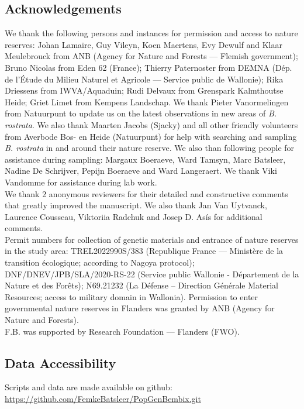 \documentclass[10pt, twoside]{book} %
\begin{document}
\clearpage
	\subsection*{Acknowledgements}
	We thank the following persons and instances for permission and access to nature reserves: Johan Lamaire, Guy Vileyn, Koen Maertens, Evy Dewulf and Klaar Meulebrouck from ANB (Agency for Nature and Forests --- Flemish government); Bruno Nicolas from Eden 62 (France); Thierry Paternoster from DEMNA (D\'{e}p. de l'\'{E}tude du Milieu Naturel et Agricole --- Service public de Wallonie); Rika Driessens from IWVA/Aquaduin; Rudi Delvaux from Grenspark Kalmthoutse Heide; Griet Limet from Kempens Landschap. We thank Pieter Vanormelingen from Natuurpunt to update us on the latest observations in new areas of \textit{B. rostrata}. We also thank Maarten Jacobs (Sjacky) and all other friendly volunteers from Averbode Bos- en Heide (Natuurpunt) for help with searching and sampling \textit{B. rostrata} in and around their nature reserve. We also than following people for assistance during sampling: Margaux Boeraeve, Ward Tamsyn, Marc Batsleer, Nadine De Schrijver, Pepijn Boeraeve and Ward Langeraert. We thank Viki Vandomme for assistance during lab work.\\
	We thank 2 anonymous reviewers for their detailed and constructive comments that greatly improved the manuscript. We also thank Jan Van Uytvanck, Laurence Cousseau, Viktoriia Radchuk and Josep D. Asís for additional comments.\\
	Permit numbers for collection of genetic materials and entrance of nature reserves in the study area: TREL2022990S/383 (Republique France --- Ministère de la transition \'{e}cologique; according to Nagoya protocol); DNF/DNEV/JPB/SLA/2020-RS-22 (Service public Wallonie - D\'{e}partement de la Nature et des For\^{e}ts); N69.21232 (La D\'{e}fense – Direction G\'{e}n\'{e}rale Material Resources; access to military domain in Wallonia). Permission to enter governmental nature reserves in Flanders was granted by ANB (Agency for Nature and Forests).\\
	F.B. was supported by Research Foundation --- Flanders (FWO).
	
	\subsection*{Data Accessibility}
	Scripts and data are made available on github:\\
	\url{https://github.com/FemkeBatsleer/PopGenBembix.git}
	
\end{document}
